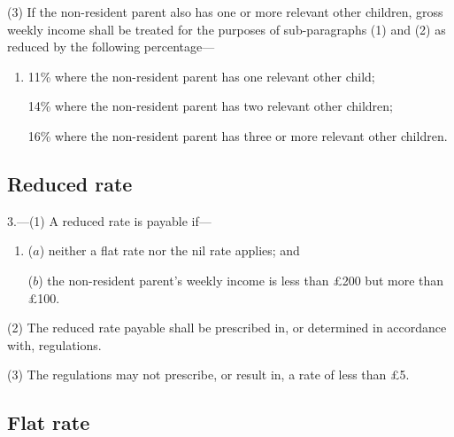 \documentclass[a4paper]{article}
\begin{document}
{{(3) If the non-resident parent also has one or more relevant other children, gross weekly income shall be treated for the purposes of sub-paragraphs (1) and (2) as reduced by the following percentage—
\begin{enumerate}\item[]
11\% where the non-resident parent has one relevant other child;

14\% where the non-resident parent has two relevant other children;

16\% where the non-resident parent has three or more relevant other children.
\end{enumerate}


}

\subsection*{Reduced rate}

3.---(1) A reduced rate is payable if---
\begin{enumerate}\item[]
($a$) neither a flat rate nor the nil rate applies; and

($b$) the non-resident parent’s  weekly income is less than £200 but more than £100.
\end{enumerate}

(2) The reduced rate payable shall be prescribed in, or determined in accordance with, regulations.

(3) The regulations may not prescribe, or result in, a rate of less than £5.


\subsection*{Flat rate}

}
\end{document}
